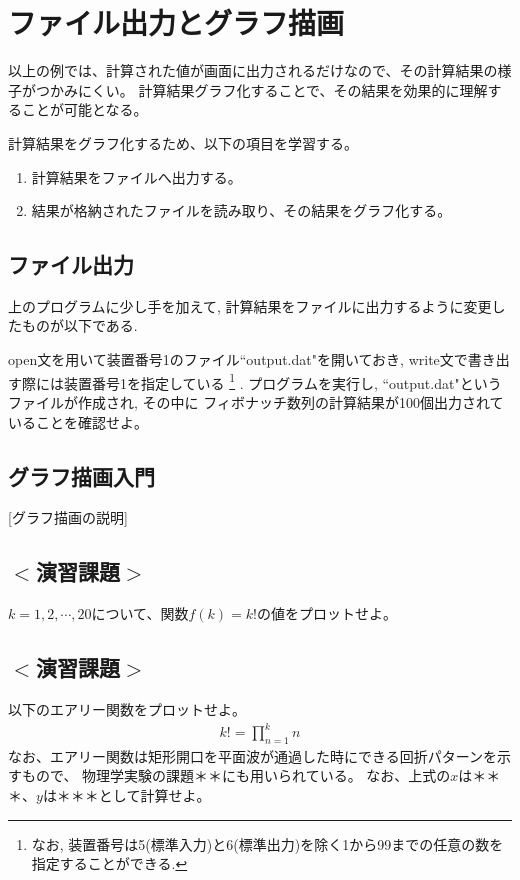 \documentclass[a4j]{jsbook}
\begin{document}
%

\section{ファイル出力とグラフ描画}
以上の例では、計算された値が画面に出力されるだけなので、その計算結果の様子がつかみにくい。
計算結果グラフ化することで、その結果を効果的に理解することが可能となる。

計算結果をグラフ化するため、以下の項目を学習する。
\begin{enumerate}
	\item 計算結果をファイルへ出力する。
	\item 結果が格納されたファイルを読み取り、その結果をグラフ化する。
\end{enumerate}

\subsection*{ファイル出力}
上のプログラムに少し手を加えて, 計算結果をファイルに出力するように変更したものが以下である.

open文を用いて装置番号1のファイル``output.dat"を開いておき,
write文で書き出す際には装置番号1を指定している
\footnote{
  なお, 装置番号は5(標準入力)と6(標準出力)を除く1から99までの任意の数を指定することができる.
}
.
プログラムを実行し, ``output.dat"というファイルが作成され, その中に
フィボナッチ数列の計算結果が100個出力されていることを確認せよ。
\\


\subsection*{グラフ描画入門}
[グラフ描画の説明]

\subsection*{$<$演習課題$>$}
$k=1,2, \cdots, 20$について、関数$f(k) = k!$の値をプロットせよ。

\subsection*{$<$演習課題$>$}
以下のエアリー関数をプロットせよ。
\begin{eqnarray}
k! = \prod_{n=1}^{k} n
\end{eqnarray}
なお、エアリー関数は矩形開口を平面波が通過した時にできる回折パターンを示すもので、
物理学実験の課題＊＊にも用いられている。
なお、上式の$x$は＊＊＊、$y$は＊＊＊として計算せよ。
\end{document}
